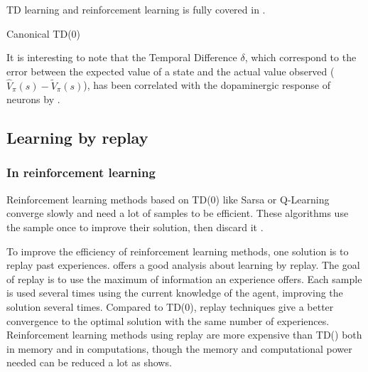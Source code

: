 \documentclass[]{article}
\begin{document}
TD learning and reinforcement learning is fully covered in \textcite{sutton_reinforcement_1998}.

\begin{algorithm}[htbp]
  \DontPrintSemicolon
  \SetAlgoNoLine
  \caption{Canonical TD(0)  \label{alg:td0}}

\end{algorithm}

It is interesting to note that the Temporal Difference \(\delta\), which correspond to the error between the expected value of a state and the actual value observed (\(\hat{V}_\pi(s) - \tilde{V}_\pi(s)\)), has been correlated with the dopaminergic response of neurons by \textcite{hollerman_dopamine_1998}.


\subsection{Learning by replay}\label{learning-by-replay}

\subsubsection{In reinforcement learning}
\label{sub:In reinforcement learning}

Reinforcement learning methods based on TD(0) like Sarsa or Q-Learning converge slowly and need a lot of samples to be efficient. These algorithms use the sample once to improve their solution, then discard it \parencite{adam_experience_2012}.

To improve the efficiency of reinforcement learning methods, one solution is to replay past experiences. \textcite{vanseijen_deeper_2015} offers a good analysis about learning by replay. The goal of replay is to use the maximum of information an experience offers. Each sample is used several times using the current knowledge of the agent, improving the solution several times. Compared to TD(0), replay techniques give a better convergence to the optimal solution with the same number of experiences. Reinforcement learning methods using replay are more expensive than TD(\textlambda) both in memory and in computations, though the memory and computational power needed can be reduced a lot as \textcite{vanseijen_deeper_2015} shows.
\end{document}
